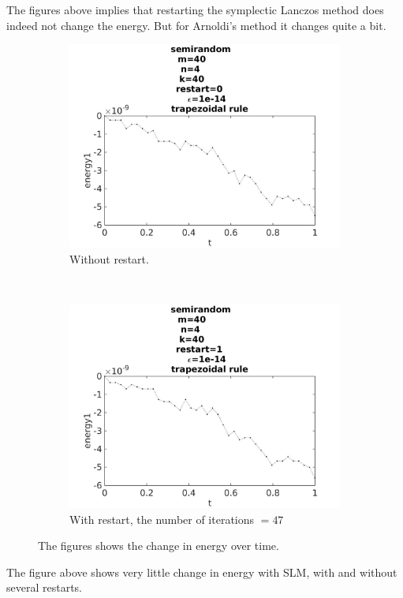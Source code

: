 The figures above implies that restarting the symplectic Lanczos method does indeed not change the energy. But for Arnoldi's method it changes quite a bit. 

\begin{figure}[H]
        \centering
        \begin{subfigure}[b]{0.45\textwidth}
                \includegraphics[width=\textwidth]{../MATLAB/fig/energytestrestart0.jpg}
                \caption{ Without restart. }
                \label{fig:energytestrestart0}
        \end{subfigure}
        ~
        \begin{subfigure}[b]{0.45\textwidth}
                \includegraphics[width=\textwidth]{../MATLAB/fig/energytestrestart1.jpg}
                \caption{ With restart, the number of iterations $= 47$ }
                \label{fig:energytestrestart1}
        \end{subfigure}
        \caption{ The figures shows the change in energy over time.}
        \label{fig:energytestrestart}
\end{figure}
The figure above shows very little change in energy with SLM, with and without several restarts. \\

